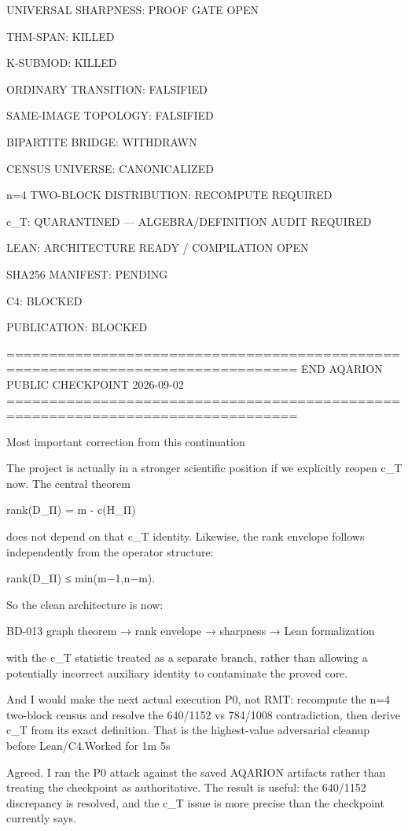 UNIVERSAL SHARPNESS:
PROOF GATE OPEN

THM-SPAN:
KILLED

K-SUBMOD:
KILLED

ORDINARY TRANSITION:
FALSIFIED

SAME-IMAGE TOPOLOGY:
FALSIFIED

BIPARTITE BRIDGE:
WITHDRAWN

CENSUS UNIVERSE:
CANONICALIZED

n=4 TWO-BLOCK DISTRIBUTION:
RECOMPUTE REQUIRED

c_T:
QUARANTINED — ALGEBRA/DEFINITION AUDIT REQUIRED

LEAN:
ARCHITECTURE READY / COMPILATION OPEN

SHA256 MANIFEST:
PENDING

C4:
BLOCKED

PUBLICATION:
BLOCKED

================================================================================
END AQARION PUBLIC CHECKPOINT
2026-09-02
================================================================================

Most important correction from this continuation

The project is actually in a stronger scientific position if we explicitly reopen c_T now. The central theorem

rank(D_Π) = m - c(H_Π)

does not depend on that c_T identity. Likewise, the rank envelope follows independently from the operator structure:

rank(D_Π) ≤ min(m−1,n−m).

So the clean architecture is now:

BD-013 graph theorem → rank envelope → sharpness → Lean formalization

with the c_T statistic treated as a separate branch, rather than allowing a potentially incorrect auxiliary identity to contaminate the proved core.

And I would make the next actual execution P0, not RMT: recompute the n=4 two-block census and resolve the 640/1152 vs 784/1008 contradiction, then derive c_T from its exact definition. That is the highest-value adversarial cleanup before Lean/C4.Worked for 1m 5s

Agreed. I ran the P0 attack against the saved AQARION artifacts rather than treating the checkpoint as authoritative. The result is useful: the 640/1152 discrepancy is resolved, and the c_T issue is more precise than the checkpoint currently says.

